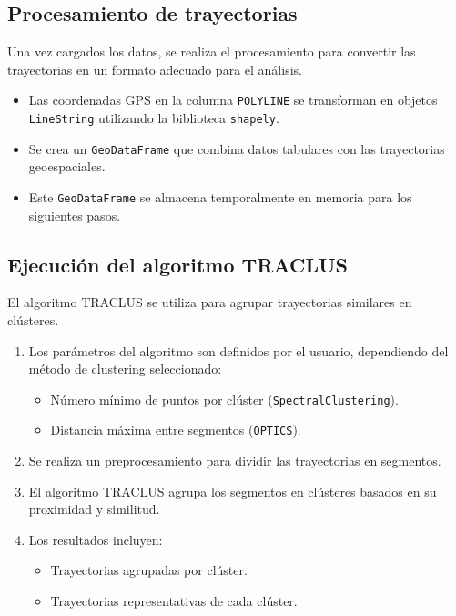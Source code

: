 \subsection{Procesamiento de trayectorias}

Una vez cargados los datos, se realiza el procesamiento para convertir las trayectorias en un formato adecuado para el análisis.

\begin{itemize}
    \item Las coordenadas GPS en la columna \texttt{POLYLINE} se transforman en objetos \texttt{LineString} utilizando la biblioteca \texttt{shapely}.
    \item Se crea un \texttt{GeoDataFrame} que combina datos tabulares con las trayectorias geoespaciales.
    \item Este \texttt{GeoDataFrame} se almacena temporalmente en memoria para los siguientes pasos.
\end{itemize}

\subsection{Ejecución del algoritmo TRACLUS}

El algoritmo TRACLUS se utiliza para agrupar trayectorias similares en clústeres.

\begin{enumerate}
    \item Los parámetros del algoritmo son definidos por el usuario, dependiendo del método de clustering seleccionado:
    \begin{itemize}
        \item Número mínimo de puntos por clúster (\texttt{SpectralClustering}).
        \item Distancia máxima entre segmentos (\texttt{OPTICS}).
    \end{itemize}
    \item Se realiza un preprocesamiento para dividir las trayectorias en segmentos.
    \item El algoritmo TRACLUS agrupa los segmentos en clústeres basados en su proximidad y similitud.
    \item Los resultados incluyen:
    \begin{itemize}
        \item Trayectorias agrupadas por clúster.
        \item Trayectorias representativas de cada clúster.
    \end{itemize}
\end{enumerate}

